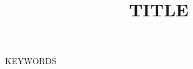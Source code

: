 \documentclass[conference]{IEEEtran}
\begin{document}
\title{{{TITLE}}}

\author{
}

\maketitle

\begin{abstract}

\end{abstract}

\begin{IEEEkeywords}
{{KEYWORDS}}
\end{IEEEkeywords}










\end{document}

